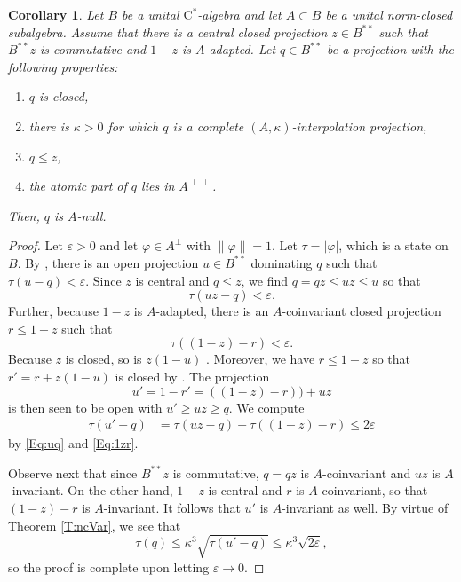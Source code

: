 \documentclass[10pt]{amsart}
\newcommand{\rC}{\mathrm{C}}
\newcommand{\eps}{\varepsilon}
\renewcommand{\phi}{\varphi}
\newtheorem{corollary}[lemma]{Corollary}
\theoremstyle{definition}
\begin{document}
\begin{corollary}\label{C:adapted}
 Let $B$ be a unital $\rC^*$-algebra and let $A\subset B$ be a unital norm-closed subalgebra. Assume that there is a central closed projection $z\in B^{**}$ such that   $B^{**}z$ is commutative and $1-z$ is $A$-adapted. Let $q\in B^{**}$ be a projection with the following properties:
 \begin{enumerate}[{\rm(i)}]
 \item $q$ is closed,
 \item there is $\kappa>0$ for which $q$ is a complete $(A,\kappa)$-interpolation projection,
  \item $q\leq z$, 
 \item the atomic part of $q$ lies in $A^{\perp\perp}$.
\end{enumerate}
Then, $q$ is $A$-null. 
 
 
\end{corollary}
\begin{proof}
 Let $\eps>0$ and let $\phi\in A^\perp$ with $\|\phi\|=1$. Let $\tau=|\phi|$, which is a state
 on $B$. By \cite[Proposition II.3]{akemann1969}, there is an open projection $u\in B^{**}$ dominating $q$ such that  $\tau(u-q)<\eps.$ Since $z$ is central and $q\leq z$, we find $q=qz\leq uz\leq u$ so that
 \begin{equation}\label{Eq:uq}
 \tau(uz-q)<\eps.
 \end{equation} 
 Further, because $1-z$ is $A$-adapted, there is an $A$-coinvariant closed projection $r\leq 1-z$ such that 
 \begin{equation}\label{Eq:1zr}
 \tau ((1-z)-r)<\eps.
 \end{equation} 
 Because $z$ is closed, so is $z(1-u)$  \cite[Proposition II.5]{akemann1969}. Moreover, we have $r\leq 1-z$ so that $r'=r+z(1-u)$ is closed by \cite[Theorem II.7]{akemann1969}. The projection \[u'=1-r'=((1-z)-r))+uz\]  is then seen to be open with $u'\geq uz\geq q$. 
We compute
 \begin{align*}
 \tau(u'-q)&=\tau(uz-q)+\tau((1-z)-r)\leq 2\eps
 \end{align*}
 by \eqref{Eq:uq} and \eqref{Eq:1zr}. 
 
 Observe next that since $B^{**}z$ is commutative, $q=qz$ is $A$-coinvariant and $uz$ is $A$-invariant.  On the other hand, $1-z$ is central and $r$ is $A$-coinvariant, so that $(1-z)-r$ is $A$-invariant. It follows that $u'$ is  $A$-invariant as well.  By virtue of Theorem \ref{T:ncVar}, we see that $$\tau(q)\leq \kappa^3\sqrt{\tau(u'-q)}\leq \kappa^3\sqrt{2\eps},$$ so the proof is complete upon letting $\eps\to 0$.
\end{proof}
\end{document}
